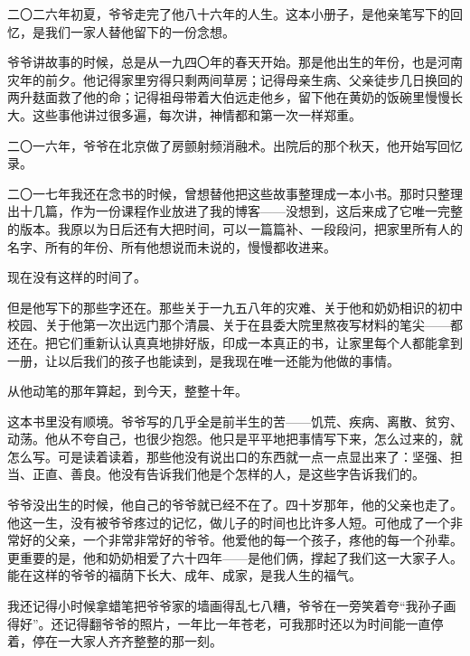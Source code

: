 
\vspace{1em}

二〇二六年初夏，爷爷走完了他八十六年的人生。这本小册子，是他亲笔写下的回忆，是我们一家人替他留下的一份念想。

爷爷讲故事的时候，总是从一九四〇年的春天开始。那是他出生的年份，也是河南灾年的前夕。他记得家里穷得只剩两间草房；记得母亲生病、父亲徒步几日换回的两升麸面救了他的命；记得祖母带着大伯远走他乡，留下他在黄奶的饭碗里慢慢长大。这些事他讲过很多遍，每次讲，神情都和第一次一样郑重。

二〇一六年，爷爷在北京做了房颤射频消融术。出院后的那个秋天，他开始写回忆录。

二〇一七年我还在念书的时候，曾想替他把这些故事整理成一本小书。那时只整理出十几篇，作为一份课程作业放进了我的博客——没想到，这后来成了它唯一完整的版本。我原以为日后还有大把时间，可以一篇篇补、一段段问，把家里所有人的名字、所有的年份、所有他想说而未说的，慢慢都收进来。

现在没有这样的时间了。

但是他写下的那些字还在。那些关于一九五八年的灾难、关于他和奶奶相识的初中校园、关于他第一次出远门那个清晨、关于在县委大院里熬夜写材料的笔尖——都还在。把它们重新认认真真地排好版，印成一本真正的书，让家里每个人都能拿到一册，让以后我们的孩子也能读到，是我现在唯一还能为他做的事情。

从他动笔的那年算起，到今天，整整十年。

这本书里没有顺境。爷爷写的几乎全是前半生的苦——饥荒、疾病、离散、贫穷、动荡。他从不夸自己，也很少抱怨。他只是平平地把事情写下来，怎么过来的，就怎么写。可是读着读着，那些他没有说出口的东西就一点一点显出来了：坚强、担当、正直、善良。他没有告诉我们他是个怎样的人，是这些字告诉我们的。

爷爷没出生的时候，他自己的爷爷就已经不在了。四十岁那年，他的父亲也走了。他这一生，没有被爷爷疼过的记忆，做儿子的时间也比许多人短。可他成了一个非常好的父亲，一个非常非常好的爷爷。他爱他的每一个孩子，疼他的每一个孙辈。更重要的是，他和奶奶相爱了六十四年——是他们俩，撑起了我们这一大家子人。能在这样的爷爷的福荫下长大、成年、成家，是我人生的福气。

我还记得小时候拿蜡笔把爷爷家的墙画得乱七八糟，爷爷在一旁笑着夸“我孙子画得好”。还记得翻爷爷的照片，一年比一年苍老，可我那时还以为时间能一直停着，停在一大家人齐齐整整的那一刻。

